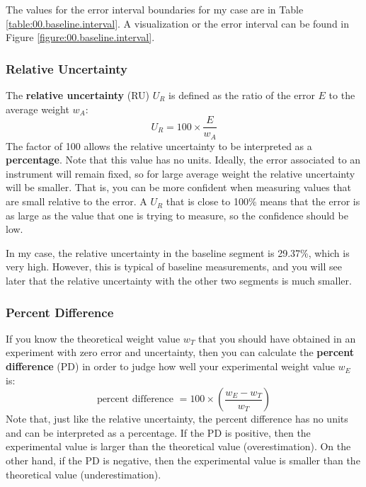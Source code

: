 The values for the error interval boundaries for my case are in Table \ref{table:00.baseline.interval}. A visualization or the error interval can be found in Figure \ref{figure:00.baseline.interval}.
\subsubsection{Relative Uncertainty}
The \textbf{relative uncertainty} (RU) $U_{R}$ is defined as the ratio of the error $E$ to the average weight $w_{A}$:
\begin{equation}
    U_{R} = 100 \times \frac{E}{w_{A}}
\end{equation}
The factor of 100 allows the relative uncertainty to be interpreted as a \textbf{percentage}. Note that this value has no units. Ideally, the error associated to an instrument will remain fixed, so for large average weight the relative uncertainty will be smaller. That is, you can be more confident when measuring values that are small relative to the error. A $U_{R}$ that is close to 100\% means that the error is as large as the value that one is trying to measure, so the confidence should be low.

In my case, the relative uncertainty in the baseline segment is 29.37\%, which is very high. However, this is typical of baseline measurements, and you will see later that the relative uncertainty with the other two segments is much smaller.
\subsubsection{Percent Difference}
If you know the theoretical weight value $w_{T}$ that you should have obtained in an experiment with zero error and uncertainty, then you can calculate the \textbf{percent difference} (PD) in order to judge how well your experimental weight value $w_{E}$ is:
\begin{equation}
    \text{percent difference } = 100 \times \left( \frac{w_{E} - w_{T}}{w_{T}} \right)
\end{equation}
Note that, just like the relative uncertainty, the percent difference has no units and can be interpreted as a percentage. If the PD is positive, then the experimental value is larger than the theoretical value (overestimation). On the other hand, if the PD is negative, then the experimental value is smaller than the theoretical value (underestimation).

